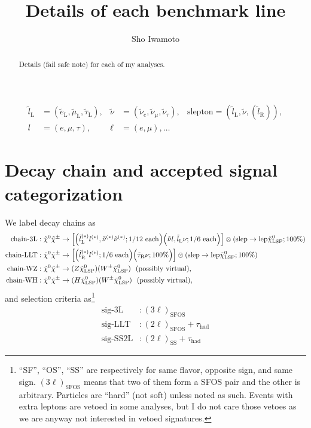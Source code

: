 \documentclass[a4paper,10pt,captions=tableheading,DIV=14]{scrartcl}
\author{Sho Iwamoto}
\title{Details of each benchmark line}
\numberwithin{equation}{section}
\newcommand\w[1]{_{\mathrm{#1}}}
\newcommand\lL{\tilde l\w L}
\newcommand\lR{\tilde l\w R}
\newcommand\neut  [1][\relax]{{\tilde\chi^0_{#1}}}
\newcommand\charPM[1][\relax]{{\tilde\chi^\pm_{#1}}}
\begin{document}
\begin{center}{\makeatletter
{\huge{}\@title}\par\vspace{2em}
{\Large \@author}\par\vspace{2em}
}
\begin{abstract}\noindent
Details (fail safe note) for each of my analyses.
\end{abstract}
\end{center}
\begin{align*}
\lL &= (\tilde e\w L, \tilde \mu\w L, \tilde\tau\w L),
&
\tilde\nu &= (\tilde \nu_e, \tilde\nu_\mu, \tilde\nu_\tau),
&
\text{slepton}=(\lL,\tilde\nu, (\lR)),
\\
l&=(e,\mu,\tau),
&
\ell&=(e,\mu),\dots
\end{align*}

\section{Decay chain and accepted signal categorization}
We label decay chains as
\begin{align}
 \text{chain-3L}&: \neut\charPM\to
\left[
\Bigl(\lL^{(*)}l^{(*)},\tilde\nu^{(*)}\tilde\nu^{(*)};\text{1/12 each}\Bigr)
\Bigl(\tilde\nu l,\lL\nu;\text{1/6 each}\Bigr)
\right]
 \otimes(\text{slep}\to \text{lep}\neut[\text{LSP}]; \text{100\%})\\
 \text{chain-LLT}&: \neut\charPM\to
\left[
\Bigl(\lR^{(*)}l^{(*)};\text{1/6 each}\Bigr)
\Bigl(\tilde \tau\w R\nu;\text{100\%}\Bigr)
\right]
 \otimes(\text{slep}\to \text{lep}\neut[\text{LSP}]; \text{100\%})\\
 \text{chain-WZ}&: \neut\charPM\to(Z\neut[\text{LSP}])(W^\pm\neut[\text{LSP}])~~\text{(possibly virtual)},\\
 \text{chain-WH}&: \neut\charPM\to(H\neut[\text{LSP}])(W^\pm\neut[\text{LSP}])~~\text{(possibly virtual)},
\end{align}
and selection criteria as\footnote{``SF'', ``OS'', ``SS'' are respectively for same flavor, opposite sign, and same sign. $(3\ell)\w{SFOS}$ means that two of them form a SFOS pair and the other is arbitrary. Particles are ``hard'' (not soft) unless noted as such. Events with extra leptons are vetoed in some analyses, but I do not care those vetoes as we are anyway not interested in vetoed signatures.}
\begin{align}
 \text{sig-3L}&:  (3\ell)\w{SFOS}\\
 \text{sig-LLT}&: (2\ell)\w{SFOS} + \tau\w{had}\\
 \text{sig-SS2L}&: (2\ell)\w{SS} + \tau\w{had}
\end{align}
\end{document}
